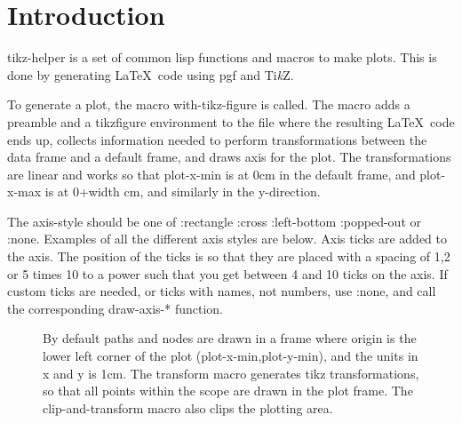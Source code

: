 \documentclass{article}
\begin{document}
\section{Introduction}
tikz-helper is a set of common lisp functions and macros to make plots. This is done by 
generating \LaTeX \ code using pgf and {Ti\textit{k}Z}.

To generate a plot, the macro with-tikz-figure is called. The macro adds a preamble and a 
tikzfigure environment to the file where the resulting \LaTeX \ code ends up, collects information needed to perform 
transformations between the data frame and a default frame, and draws axis for the plot. The transformations are
linear and works so that plot-x-min is at 0cm in the default frame, and plot-x-max is at 0+width cm, 
and similarly in the y-direction.

The axis-style should be one of :rectangle :cross :left-bottom :popped-out or :none.
Examples of all the different axis styles are below. Axis ticks are added to the axis. The position of the ticks is so
that they are placed with a spacing of 1,2 or 5 times 10 to a power such that you get between 4 and 10 ticks on the 
axis. If custom ticks are needed, or ticks with names, not numbers, use :none, and call the corresponding draw-axis-*
function.

\begin{figure}[H]
\centering

\caption{By default paths and nodes are drawn in a frame where origin is the lower left corner of the plot (plot-x-min,plot-y-min), 
and the units in x and y is 1cm. The transform macro generates tikz transformations, so that all points
within the scope are drawn in the plot frame. The clip-and-transform macro also clips the plotting area.}
\end{figure}
\end{document}
